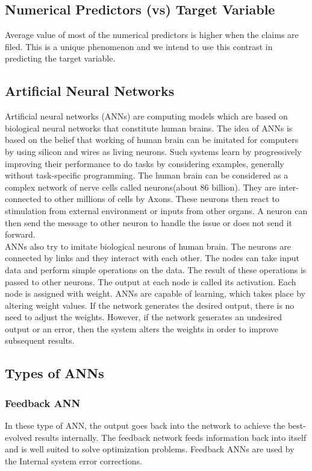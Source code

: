 \subsection{Numerical Predictors (vs) Target Variable}
 Average value of most of the numerical predictors is higher when the claims are filed. This is a unique phenomenon and we intend to use this contrast in predicting the target variable.
  
\subsection{Artificial Neural Networks}
Artificial neural networks (ANNs)  are computing models which are based on biological neural networks that constitute human brains. The idea of ANNs is based on the belief that working of human brain can be imitated for computers by using silicon and wires as living neurons. Such systems learn by progressively improving their performance to do tasks by considering examples, generally without task-specific programming. The human brain can be considered as a complex network of nerve cells called neurons(about 86 billion). They are inter-connected to other millions of cells by Axons. These neurons then react to stimulation from external environment or inputs from other organs. A neuron can then send the message to other neuron to handle the issue or does not send it forward. 
\\
ANNs also try to imitate biological neurons of human brain. The neurons are connected by links and they interact with each other. The nodes can take input data and perform simple operations on the data. The result of these operations is passed to other neurons. The output at each node is called its activation. Each node is assigned with weight. ANNs are capable of learning, which takes place by altering weight values. If the network generates the desired output, there is no need to adjust the weights. However, if the network generates an undesired output or an error, then the system alters the weights in order to improve subsequent results.

\subsection{Types of ANNs}
\subsubsection{Feedback ANN}
In these type of ANN, the output goes back into the network to achieve the best-evolved results internally. The feedback network feeds information back into itself and is well suited to solve optimization problems. Feedback ANNs are used by the Internal system error corrections. 
